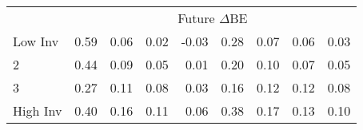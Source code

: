 \begin{table}[!ht]
\begin{tabular}{lrrrrrrrr}
  
    & \multicolumn{8}{c}{Future $\Delta\text{BE}$}  \\
     \cmidrule(r){2-5} \cmidrule(r){6-9}
    Low Inv  & 0.59  & 0.06  & 0.02  & -0.03  & 0.28  & 0.07  & 0.06  & 0.03   \\
    2  & 0.44  & 0.09  & 0.05  & 0.01  & 0.20  & 0.10  & 0.07  & 0.05   \\
    3  & 0.27  & 0.11  & 0.08  & 0.03  & 0.16  & 0.12  & 0.12  & 0.08   \\
    High Inv  & 0.40  & 0.16  & 0.11  & 0.06  & 0.38  & 0.17  & 0.13  & 0.10   \\
    
  
  \bottomrule
\end{tabular}
\label{tbl:Size_BM_Inv_chars}
\end{table}